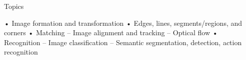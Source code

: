 Topics

• Image formation and transformation
• Edges, lines, segments/regions, and corners
• Matching
– Image alignment and tracking
– Optical flow
• Recognition
– Image classification
– Semantic segmentation, detection, action
recognition